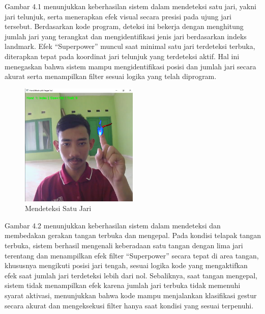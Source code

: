 \documentclass[11pt,a4paper]{article}
\begin{document}
   Gambar 4.1 menunjukkan keberhasilan sistem dalam mendeteksi satu jari, yakni jari telunjuk, serta menerapkan efek visual secara presisi pada ujung jari tersebut. Berdasarkan kode program, deteksi ini bekerja dengan menghitung jumlah jari yang terangkat dan mengidentifikasi jenis jari berdasarkan indeks landmark. Efek “Superpower” muncul saat minimal satu jari terdeteksi terbuka, diterapkan tepat pada koordinat jari telunjuk yang terdeteksi aktif. Hal ini menegaskan bahwa sistem mampu mengidentifikasi posisi dan jumlah jari secara akurat serta menampilkan filter sesuai logika yang telah diprogram.
    \begin{figure}[H]
        \centering
        \includegraphics[width=0.5\textwidth]{Figure/one-finger.jpg}
        \caption{Mendeteksi Satu Jari}
        \label{fig:hand_sign_calculator}
    \end{figure}
    Gambar 4.2 menunjukkan keberhasilan sistem dalam mendeteksi dan membedakan gerakan tangan terbuka dan mengepal. Pada kondisi telapak tangan terbuka, sistem berhasil mengenali keberadaan satu tangan dengan lima jari terentang dan menampilkan efek filter “Superpower” secara tepat di area tangan, khususnya mengikuti posisi jari tengah, sesuai logika kode yang mengaktifkan efek saat jumlah jari terdeteksi lebih dari nol. Sebaliknya, saat tangan mengepal, sistem tidak menampilkan efek karena jumlah jari terbuka tidak memenuhi syarat aktivasi, menunjukkan bahwa kode mampu menjalankan klasifikasi gestur secara akurat dan mengeksekusi filter hanya saat kondisi yang sesuai terpenuhi.
\end{document}
